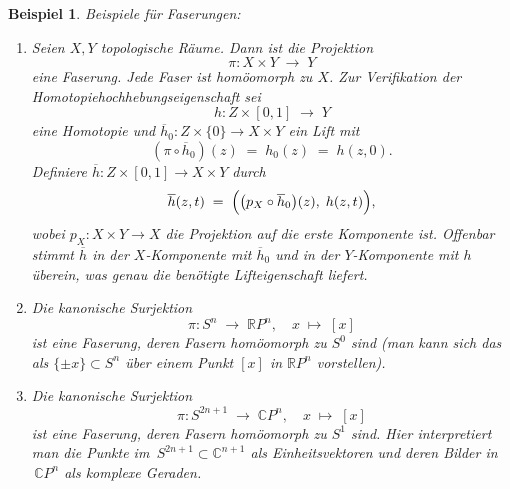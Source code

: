 \documentclass[12pt]{article}
\numberwithin{conj}{section}
\newtheorem{example}[conj]{Beispiel}
\begin{document}
        \begin{example}
            \label{examplesFibrations}
            Beispiele für Faserungen:
            \begin{enumerate}[nolistsep]
                \item Seien \(X,Y\) topologische Räume. Dann ist die Projektion
                      \[
                        \pi : X \times Y \;\longrightarrow\; Y
                      \]
                      eine Faserung. Jede Faser ist homöomorph zu \(X\). Zur Verifikation der Homotopiehochhebungseigenschaft sei
                      \[
                        h : Z \times [0,1] \;\longrightarrow\; Y
                      \]
                      eine Homotopie und \(\overline{h}_0 : Z \times \{0\} \to X \times Y\) ein Lift mit 
                      \[
                        (\pi \circ \overline{h}_0)(z) \;=\; h_0(z) \;=\; h(z,0).
                      \]
                      Definiere \(\overline{h} : Z \times [0,1] \to X \times Y\) durch
                      \[
                        \overline{h}(z,t)
                        \;=\;
                        \Bigl(\bigl(p_X \circ \overline{h}_0\bigr)(z),\; h(z,t)\Bigr),
                      \]
                      wobei \(p_X : X \times Y \to X\) die Projektion auf die erste Komponente ist. Offenbar stimmt \(\overline{h}\) in der \(X\)-Komponente mit \(\overline{h}_0\) und in der \(Y\)-Komponente mit \(h\) überein, was genau die benötigte Lifteigenschaft liefert.
                      
                \item Die kanonische Surjektion 
                      \[
                        \pi : S^n \;\longrightarrow\; \mathbb{R}P^n,\quad x \;\mapsto\; [x]
                      \]
                      ist eine Faserung, deren Fasern homöomorph zu \(S^0\) sind (man kann sich das als \(\{\pm x\}\subset S^n\) über einem Punkt \([x]\) in \(\mathbb{R}P^n\) vorstellen).
                      
                \item Die kanonische Surjektion 
                      \[
                        \pi : S^{2n+1} \;\longrightarrow\; \mathbb{C}P^n,\quad x \;\mapsto\; [x]
                      \]
                      ist eine Faserung, deren Fasern homöomorph zu \(S^1\) sind. Hier interpretiert man die Punkte im \(\,S^{2n+1}\subset \mathbb{C}^{n+1}\) als Einheitsvektoren und deren Bilder in \(\,\mathbb{C}P^n\) als komplexe Geraden.
            \end{enumerate}
        \end{example}
        
\end{document}

